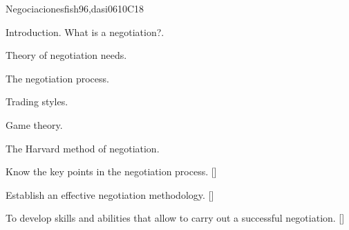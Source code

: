 \begin{syllabus}
\begin{unit}{}{Negociaciones}{fish96,dasi06}{10}{C18}
\begin{topics}
      \item Introduction. What is a negotiation?.
      \item Theory of negotiation needs.
      \item The negotiation process.
      \item Trading styles.
      \item Game theory.
      \item The Harvard method of negotiation.
   \end{topics}
   \begin{learningoutcomes}
      \item Know the key points in the negotiation process. [\Usage]
      \item Establish an effective negotiation methodology. [\Usage]
      \item To develop skills and abilities that allow to carry out a successful negotiation. [\Usage]
   \end{learningoutcomes}
\end{unit}

\begin{coursebibliography}
\end{coursebibliography}

\end{syllabus}

%
